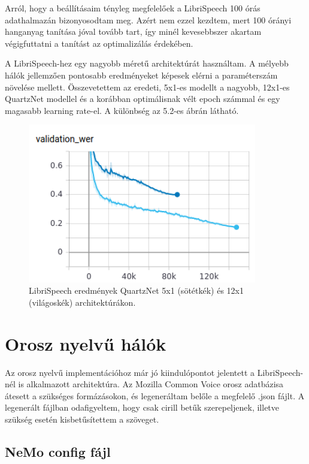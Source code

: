 Arról, hogy a beállításaim tényleg megfelelőek a LibriSpeech 100 órás adathalmazán bizonyosodtam meg. Azért nem ezzel kezdtem, mert 100 órányi hanganyag tanítása jóval tovább tart, így minél kevesebbszer akartam végigfuttatni a tanítást az optimalizálás érdekében.

A LibriSpeech-hez egy nagyobb méretű architektúrát használtam. A mélyebb hálók jellemzően pontosabb eredményeket képesek elérni a paraméterszám növelése mellett. Összevetettem az eredeti, 5x1-es modellt a nagyobb, 12x1-es QuartzNet modellel és a korábban optimálisnak vélt epoch számmal és egy magasabb learning rate-el. A különbség az 5.2-es ábrán látható.

\begin{figure}[!ht]
\centering
\includegraphics[width=100mm, keepaspectratio]{figures/architecture_comparrison.png}
\caption{LibriSpeech eredmények QuartzNet 5x1 (sötétkék) és 12x1 (világoskék) architektúrákon.}
\label{fig:TeXstudio}
\end{figure}

\section{Orosz nyelvű hálók}

Az orosz nyelvű implementációhoz már jó kiindulópontot jelentett a LibriSpeech-nél is alkalmazott architektúra. Az Mozilla Common Voice orosz adatbázisa átesett a szükséges formázásokon, és legeneráltam belőle a megfelelő .json fájlt. A legenerált fájlban odafigyeltem, hogy csak cirill betűk szerepeljenek, illetve szükség esetén kisbetűsítettem a szöveget.

\subsection{NeMo config fájl}

